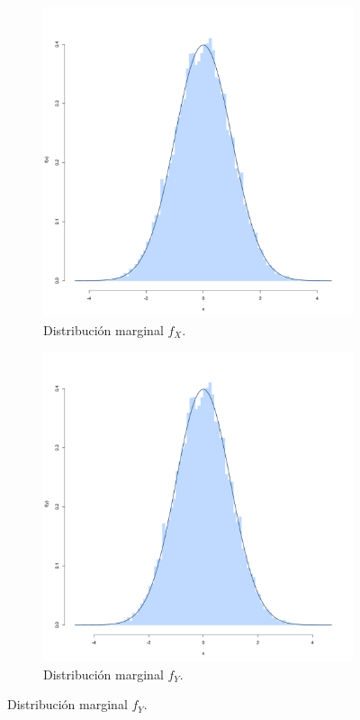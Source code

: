 \documentclass[11pt,a4paper]{article}
\begin{document}
\begin{figure}
    \centering
    \begin{subfigure}[t]{0.45\textwidth}
        \centering
        \includegraphics[width=\linewidth]{x_norm.png} 
        \caption{Distribución marginal $f_X$.} \label{fig:xnorm}
    \end{subfigure}
    \hfill
    \begin{subfigure}[t]{0.45\textwidth}
        \centering
        \includegraphics[width=\linewidth]{y_norm.png} 
        \caption{Distribución marginal $f_Y$.} \label{fig:ynorm}
    \end{subfigure}


\end{figure}
\end{document}
